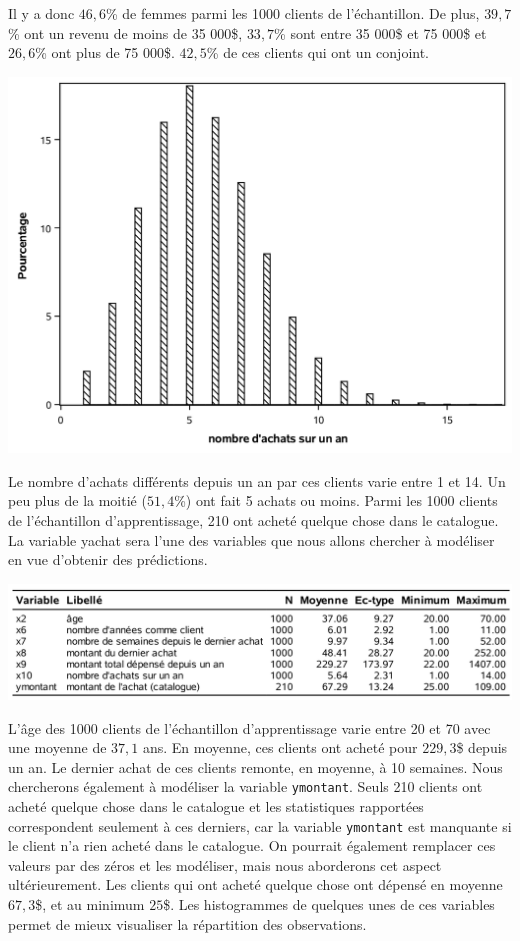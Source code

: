 \documentclass[
  11pt,
  letterpaper,
]{book}
\theoremstyle{definition}
\theoremstyle{definition}
\theoremstyle{definition}
\theoremstyle{remark}
\begin{document}
Il y a donc \(46,6\)\% de femmes parmi les 1000 clients de l'échantillon. De plus, \(39,7\)\% ont un revenu de moins de 35 000\$, \(33,7\)\% sont entre 35 000\$ et 75 000\$ et \(26,6\)\% ont plus de 75 000\$. \(42,5\)\% de ces clients qui ont un conjoint.

\begin{center}\includegraphics[width=0.9\linewidth]{figures/02-select-e4} \end{center}

Le nombre d'achats différents depuis un an par ces clients varie entre 1 et 14. Un peu plus de la moitié (\(51,4\)\%) ont fait 5 achats ou moins. Parmi les 1000 clients de l'échantillon d'apprentissage, 210 ont acheté quelque chose dans le catalogue. La variable yachat sera l'une des variables que nous allons chercher à modéliser en vue d'obtenir des prédictions.

\begin{center}\includegraphics[width=0.9\linewidth]{figures/02-select-e5} \end{center}

L'âge des 1000 clients de l'échantillon d'apprentissage varie entre 20 et 70 avec une moyenne de \(37,1\) ans. En moyenne, ces clients ont acheté pour \(229,3\)\$ depuis un an. Le dernier achat de ces clients remonte, en moyenne, à 10 semaines. Nous chercherons également à modéliser la variable \texttt{ymontant}. Seuls 210 clients ont acheté quelque chose dans le catalogue et les statistiques rapportées correspondent seulement à ces derniers, car la variable \texttt{ymontant} est manquante si le client n'a rien acheté dans le catalogue. On pourrait également remplacer ces valeurs par des zéros et les modéliser, mais nous aborderons cet aspect ultérieurement. Les clients qui ont acheté quelque chose ont dépensé en moyenne \(67,3\)\$, et au minimum \(25\)\$. Les histogrammes de quelques unes de ces variables permet de mieux visualiser la répartition des observations.
\end{document}
